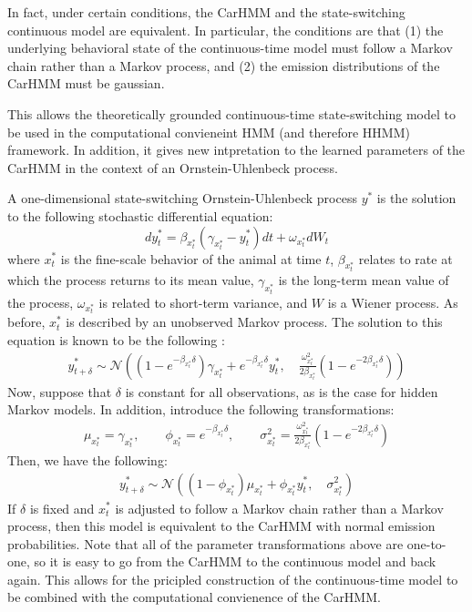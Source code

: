 In fact, under certain conditions, the CarHMM and the state-switching continuous model are equivalent. In particular, the conditions are that (1) the underlying behavioral state of the continuous-time model must follow a Markov chain rather than a Markov process, and (2) the emission distributions of the CarHMM must be gaussian.

This allows the theoretically grounded continuous-time state-switching model to be used in the computational convieneint HMM (and therefore HHMM) framework. In addition, it gives new intpretation to the learned parameters of the CarHMM in the context of an Ornstein-Uhlenbeck process.

A one-dimensional state-switching Ornstein-Uhlenbeck process $y^*$ is the solution to the following stochastic differential equation:
%
$$dy^*_t = \beta_{x^*_t}(\gamma_{x^*_t} - y^*_t)dt + \omega_{x^*_t} dW_t$$
%
where $x^*_t$ is the fine-scale behavior of the animal at time $t$, $\beta_{x^*_t}$ relates to rate at which the process returns to its mean value, $\gamma_{x^*_t}$ is the long-term mean value of the process, $\omega_{x^*_t}$ is related to short-term variance, and $W$ is a Wiener process. As before, $x^*_t$ is described by an unobserved Markov process. The solution to this equation is known to be the following \cite{Michelot:2019}:
\begin{align*}
	y^*_{t+\delta} \sim \mathcal{N}\left((1-e^{-\beta_{x^*_t}\delta})\gamma_{x^*_t} + e^{-\beta_{x^*_t}\delta} y^*_t,\quad \frac{\omega_{x^*_t}^2}{2\beta_{x^*_t}} (1-e^{-2\beta_{x^*_t}\delta})\right)
\end{align*}
Now, suppose that $\delta$ is constant for all observations, as is the case for hidden Markov models. In addition, introduce the following transformations:
\begin{align*}
	\mu_{x^*_t} = \gamma_{x^*_t}, \qquad \phi_{x^*_t} = e^{-\beta_{x^*_t}\delta}, \qquad \sigma^2_{x^*_t} = \frac{\omega_{x^*_t}^2}{2\beta_{x^*_t}} (1-e^{-2\beta_{x^*_t}\delta})
\end{align*}
Then, we have the following:
\begin{align*}
	y^*_{t+\delta} \sim \mathcal{N}\left((1-\phi_{x^*_t})\mu_{x^*_t} + \phi_{x^*_t} y^*_t,\quad \sigma_{x^*_t}^2 \right)
\end{align*}
%
If $\delta$ is fixed and $x^*_t$ is adjusted to follow a Markov chain rather than a Markov process, then this model is equivalent to the CarHMM with normal emission probabilities. Note that all of the parameter transformations above are one-to-one, so it is easy to go from the CarHMM to the continuous model and back again. This allows for the pricipled construction of the continuous-time model to be combined with the computational convienence of the CarHMM.

